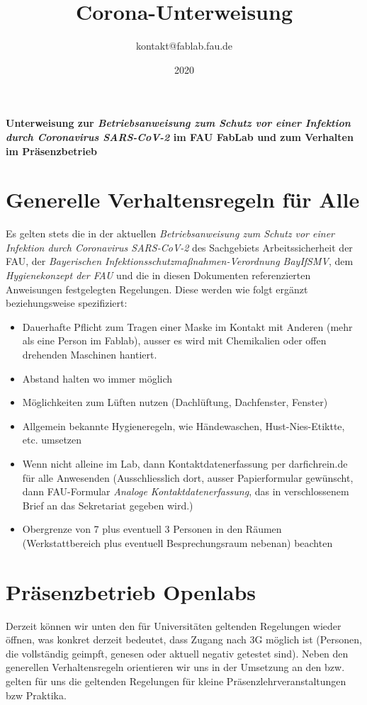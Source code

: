 \documentclass[13pt]{\basedir/fablab-document}
\date{2020}
\author{kontakt@fablab.fau.de}
\title{Corona-Unterweisung}
\begin{document}
\maketitle

\begin{center}
  \textbf{Unterweisung zur \emph{Betriebsanweisung zum Schutz vor einer Infektion durch Coronavirus SARS-CoV-2} im FAU FabLab und zum Verhalten im Präsenzbetrieb}
\end{center}

\vbox{\vspace{1cm}}


\section{Generelle Verhaltensregeln für Alle}
Es gelten stets die in der aktuellen 
\emph{Betriebsanweisung zum Schutz vor einer Infektion durch Coronavirus SARS-CoV-2} des Sachgebiets Arbeitssicherheit der FAU, 
der \emph{Bayerischen Infektionsschutzmaßnahmen-Verordnung BayIfSMV}, 
dem \emph{Hygienekonzept der FAU} und 
die in diesen Dokumenten referenzierten Anweisungen 
festgelegten Regelungen. Diese werden wie folgt ergänzt beziehungsweise spezifiziert: 

\begin{itemize}
  \item  Dauerhafte Pflicht zum Tragen einer Maske im Kontakt mit Anderen (mehr als eine Person im Fablab), ausser es wird mit Chemikalien oder offen drehenden Maschinen hantiert.
  \item  Abstand halten wo immer möglich
  \item  Möglichkeiten zum Lüften nutzen (Dachlüftung, Dachfenster, Fenster)
  \item  Allgemein bekannte Hygieneregeln, wie Händewaschen, Hust-Nies-Etiktte, etc. umsetzen
  \item  Wenn nicht alleine im Lab, dann Kontaktdatenerfassung per darfichrein.de für alle Anwesenden (Ausschliesslich dort, ausser Papierformular gewünscht, dann FAU-Formular \emph{Analoge Kontaktdatenerfassung}, das in verschlossenem Brief an das Sekretariat gegeben wird.) 
  \item  Obergrenze von 7 plus eventuell 3 Personen in den Räumen (Werkstattbereich plus eventuell Besprechungsraum nebenan) beachten
\end{itemize}


\section{Präsenzbetrieb Openlabs}
Derzeit können wir unten den für Universitäten geltenden Regelungen wieder öffnen, was konkret derzeit bedeutet, dass Zugang nach 3G möglich ist (Personen, die vollständig geimpft, genesen oder aktuell negativ getestet sind).
Neben den generellen Verhaltensregeln orientieren wir uns in der Umsetzung an den bzw. gelten für uns die geltenden Regelungen für kleine Präsenzlehrveranstaltungen bzw Praktika.
\end{document}
